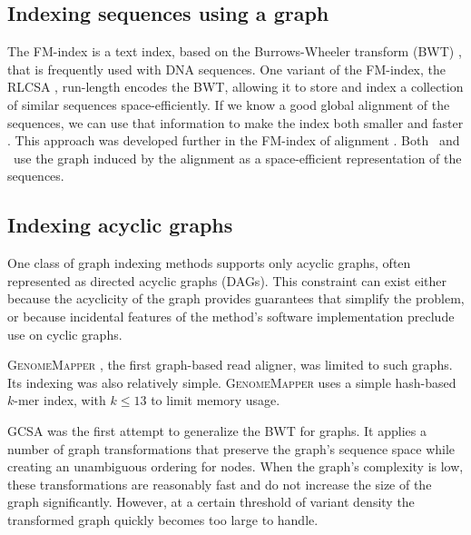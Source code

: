 \subsection{Indexing sequences using a graph}

The FM-index \cite{Ferragina_2005} is a text index, based on the Burrows-Wheeler transform (BWT) \cite{Burrows_1994}, that is frequently used with DNA sequences.
One variant of the FM-index, the RLCSA \cite{Maekinen_2010}, run-length encodes the BWT, allowing it to store and index a collection of similar sequences space-efficiently.
If we know a good global alignment of the sequences, we can use that information to make the index both smaller and faster \cite{Huang_2010}.
This approach was developed further in the FM-index of alignment \cite{Na_2016,Na_2018}.
Both \cite{Huang_2010}\ and \citep{Na_2016}\ use the graph induced by the alignment as a space-efficient representation of the sequences.

\subsection{Indexing acyclic graphs}

One class of graph indexing methods supports only acyclic graphs, often represented as directed acyclic graphs (DAGs).
This constraint can exist either because the acyclicity of the graph provides guarantees that simplify the problem, or because incidental features of the method's software implementation preclude use on cyclic graphs.
 
\textsc{GenomeMapper} \cite{Schneeberger_2009}, the first graph-based read aligner, was limited to such graphs.
Its indexing was also relatively simple.
\textsc{GenomeMapper} uses a simple hash-based $k$-mer index, with $k \le 13$ to limit memory usage.

\textsc{GCSA} \cite{Siren_2014} was the first attempt to generalize the BWT for graphs.
It applies a number of graph transformations that preserve the graph's sequence space while creating an unambiguous ordering for nodes.
When the graph's complexity is low, these transformations are reasonably fast and do not increase the size of the graph significantly.
However, at a certain threshold of variant density the transformed graph quickly becomes too large to handle.

